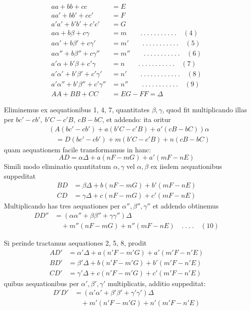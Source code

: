 %
\[
\begin{aligned}
aa+bb+cc&=E\\
aa'+bb'+cc'&=F\\
a'a'+b'b'+c'c'&=G\\
a\alpha+b\beta+c\gamma&=m\qquad .\ .\ .\ .\ .\ .\ .\ .\ .\ .\ .\quad(4)\\
a\alpha'+b\beta'+c\gamma'&=m'\qquad .\ .\ .\ .\ .\ .\ .\ .\ .\ .\ .\quad(5)\\
a\alpha''+b\beta''+c\gamma''&=m''\qquad .\ .\ .\ .\ .\ .\ .\ .\ .\ .\ .\quad(6)\\
a'\alpha+b'\beta+c'\gamma&=n\qquad .\ .\ .\ .\ .\ .\ .\ .\ .\ .\ .\quad(7)\\
a'\alpha'+b'\beta'+c'\gamma'&=n'\qquad .\ .\ .\ .\ .\ .\ .\ .\ .\ .\ .\ .\quad(8)\\
a'\alpha''+b'\beta''+c'\gamma''&=n''\qquad .\ .\ .\ .\ .\ .\ .\ .\ .\ .\ .\quad(9)\\
AA+BB+CC&=EG-FF=\Delta
\end{aligned}
\]
\par\indent Eliminemus ex aequationibus 1, 4, 7, quantitates \(\beta,\gamma\), quod fit multiplicando illas per \(bc'-cb',\ b'C-c'B,\ cB-bC\), et addendo: ita oritur
\[
\begin{aligned}
&(A(bc'-cb')+a(b'C-c'B)+a'(cB-bC))\alpha\\
&\quad=D(bc'-cb')+m(b'C-c'B)+n(cB-bC)
\end{aligned}
\]
quam aequationem facile transformamus in hanc:
\[
AD=\alpha\Delta+a(nF-mG)+a'(mF-nE)
\]
Simili modo eliminatio quantitatum \(\alpha,\gamma\) vel \(\alpha,\beta\) ex iisdem aequationibus suppeditat
\[
\begin{aligned}
BD&=\beta\Delta+b(nF-mG)+b'(mF-nE)\\
CD&=\gamma\Delta+c(nF-mG)+c'(mF-nE)
\end{aligned}
\]
Multiplicando has tres aequationes per \(\alpha'',\beta'',\gamma''\) et addendo obtinemus
\[
\begin{aligned}
DD''&=(\alpha\alpha''+\beta\beta''+\gamma\gamma'')\Delta\\
&\quad+m''(nF-mG)+n''(mF-nE)\quad .\ .\ .\ .\quad(10)
\end{aligned}
\]
\par\indent Si perinde tractamus aequationes 2, 5, 8, prodit
\[
\begin{aligned}
AD'&=\alpha'\Delta+a(n'F-m'G)+a'(m'F-n'E)\\
BD'&=\beta'\Delta+b(n'F-m'G)+b'(m'F-n'E)\\
CD'&=\gamma'\Delta+c(n'F-m'G)+c'(m'F-n'E)
\end{aligned}
\]
quibus aequationibus per \(\alpha',\beta',\gamma'\) multiplicatis, additio suppeditat:
\[
\begin{aligned}
D'D'&=(\alpha'\alpha'+\beta'\beta'+\gamma'\gamma')\Delta\\
&\quad+m'(n'F-m'G)+n'(m'F-n'E)
\end{aligned}
\]
